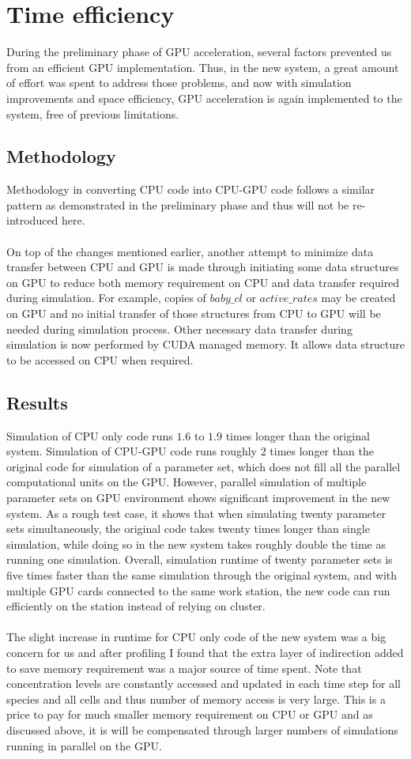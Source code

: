 \documentclass[../thesis.tex]{subfiles}
\begin{document}
\chapter{Time efficiency}
\label{ch:pruning}
During the preliminary phase of GPU acceleration, several factors prevented us from an efficient GPU implementation. Thus, in the new system, a great amount of effort was spent to address those problems, and now with simulation improvements and space efficiency, GPU acceleration is again implemented to the system, free of previous limitations. 	

\section{Methodology}
Methodology in converting CPU code into CPU-GPU code follows a similar pattern as demonstrated in the preliminary phase and thus will not be re-introduced here. \\
\\
On top of the changes mentioned earlier, another attempt to minimize data transfer between CPU and GPU is made through initiating some data structures on GPU to reduce both memory requirement on CPU and data transfer required during simulation. For example, copies of $baby\_cl$ or $active\_rates$ may be created on GPU and no initial transfer of those structures from CPU to GPU will be needed during simulation process. Other necessary data transfer during simulation is now performed by CUDA managed memory. It allows data structure to be accessed on CPU when required. 
\section{Results}
Simulation of CPU only code runs $1.6$ to $1.9$ times longer than the original system. Simulation of CPU-GPU code runs roughly $2$ times longer than the original code for simulation of a parameter set, which does not fill all the parallel computational units on the GPU. However, parallel simulation of multiple parameter sets on GPU environment shows significant improvement in the new system. As a rough test case, it shows that when simulating twenty parameter sets simultaneously, the original code takes twenty times longer than single simulation, while doing so in the new system takes roughly double the time as running one simulation. Overall, simulation runtime of twenty parameter sets is five times faster than the same simulation through the original system, and with multiple GPU cards connected to the same work station, the new code can run efficiently on the station instead of relying on cluster.\\
\\
The slight increase in runtime for CPU only code of the new system was a big concern for us and after profiling I found that the extra layer of indirection added to save memory requirement was a major source of time spent. Note that concentration levels are constantly accessed and updated in each time step for all species and all cells and thus number of memory access is very large. This is a price to pay for much smaller memory requirement on CPU or GPU and as discussed above, it is will be compensated through larger numbers of simulations running in parallel on the GPU. 
\end{document}
